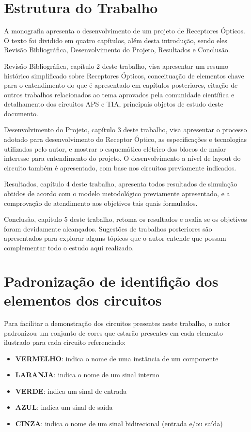 \section{Estrutura do Trabalho}

A monografia apresenta o desenvolvimento de um projeto de Receptores Ópticos. O texto foi dividido em quatro capítulos,
além desta introdução, sendo eles Revisão Bibliográfica, Desenvolvimento do Projeto, Resultados e Conclusão.

Revisão Bibliográfica, capítulo 2 deste trabalho, visa apresentar um resumo histórico simplificado sobre Receptores
Ópticos, conceituação de elementos chave para o entendimento do que é apresentado em capítulos posteriores, citação de
outros trabalhos relacionados ao tema aprovados pela comunidade científica e detalhamento dos circuitos APS e TIA,
principais objetos de estudo deste documento.

Desenvolvimento do Projeto, capítulo 3 deste trabalho, visa apresentar o processo adotado para desenvolvimento do
Receptor Óptico, as especificações e tecnologias utilizadas pelo autor, e mostrar o esquemático elétrico dos blocos de
maior interesse para entendimento do projeto. O desenvolvimento a nível de layout do circuito também é apresentado, com
base nos circuitos previamente indicados.

Resultados, capítulo 4 deste trabalho, apresenta todos resultados de simulação obtidos de acordo com o modelo metodológico previamente apresentado, e a comprovação de atendimento aos objetivos tais quais formulados.

Conclusão, capítulo 5 deste trabalho, retoma os resultados e avalia se os objetivos foram devidamente alcançados. Sugestões de trabalhos posteriores são apresentados para explorar alguns tópicos que o autor entende que possam complementar todo o estudo aqui realizado.

\section{Padronização de identifição dos elementos dos circuitos}
\label{section:padrao_sinais}

Para facilitar a demonstração dos circuitos presentes neste trabalho, o autor padronizou um conjunto de cores que estarão presentes em cada elemento ilustrado para cada circuito referenciado:

\begin{itemize}
    \item \textbf{\color{red}VERMELHO}: indica o nome de uma inst\^ancia de um componente
    \item \textbf{\color{orange}LARANJA}: indica o nome de um sinal interno
    \item \textbf{\color{green}VERDE}: indica um sinal de entrada
    \item \textbf{\color{blue}AZUL}: indica um sinal de sa\'ida
    \item \textbf{\color{gray}CINZA}: indica o nome de um sinal bidirecional (entrada e/ou sa\'ida)
\end{itemize}
